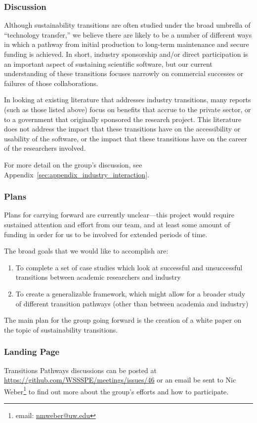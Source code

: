 \subsubsection{Discussion}

Although sustainability transitions are often studied under the broad umbrella
of ``technology transfer,'' we believe there are likely to be a number of
different ways in which a pathway from initial production to long-term
maintenance and secure funding is achieved. In short, industry sponsorship
and/or direct participation is an important aspect of sustaining scientific
software, but our current understanding of these transitions focuses narrowly on
commercial successes or failures of those collaborations.

In looking at existing literature that addresses industry transitions, many
reports (such as those listed above) focus on benefits that accrue to the
private sector, or to a government that originally sponsored the research
project. This literature does not address the impact that these transitions have
on the accessibility or usability of the software, or the impact that these
transitions have on the career of the researchers involved.

For more detail on the group's discussion, see
Appendix~\ref{sec:appendix_industry_interaction}.

\subsubsection{Plans}

Plans for carrying forward are currently unclear---this project would require
sustained attention and effort from our team, and at least some amount of
funding in order for us to be involved for extended periods of time.

The broad goals that we would like to accomplish are: 

\begin{enumerate}

\item To complete a set of case studies which look at successful and
unsuccessful transitions between academic researchers and industry

\item To create a generalizable framework, which might allow for a broader study
of different transition pathways (other than between academia and industry)

\end{enumerate}

The main plan for the group going forward is the creation of a white paper on
the topic of sustainability transitions.

\subsubsection{Landing Page}

Transitions Pathways discussions can be posted at
\url{https://github.com/WSSSPE/meetings/issues/46} or an email be sent to Nic
Weber\footnote{email: \href{mailto:nmweber@uw.edu}{nmweber@uw.edu}} to find out
more about the group's efforts and how to participate.
